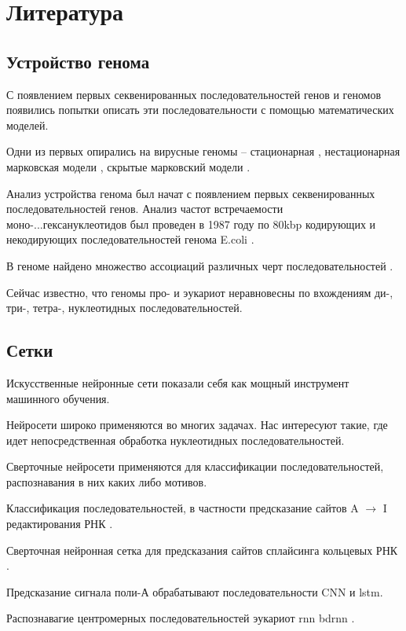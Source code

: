 \section{Литература}
\subsection{Устройство генома}
С появлением первых секвенированных последовательностей генов и геномов появились попытки описать эти последовательности с помощью математических моделей.

Одни из первых опирались на вирусные геномы -- стационарная \cite{garden_markov_1980}, нестационарная марковская модели \cite{tavare_codon_1989}, скрытые марковский модели \cite{churchill_stochastic_1989}. 

Анализ устройства генома был начат с появлением первых секвенированных последовательностей генов. Анализ частот встречаемости моно-...гексануклеотидов был проведен в 1987 году по 80kbp кодирующих и некодирующих последовательностей генома E.coli \cite{phillips_mono-_1987}. 

В геноме найдено множество ассоциаций различных черт последовательностей \cite{pevzner_nucleotide_1992}.

Сейчас известно, что геномы про- и эукариот неравновесны по вхождениям ди-, три-, тетра-, нуклеотидных последовательностей.




\subsection{Сетки}
Искусственные нейронные сети показали себя как мощный инструмент машинного обучения.


Нейросети широко применяются во многих задачах.
Нас интересуют такие, где идет непосредственная обработка нуклеотидных последовательностей.


Сверточные нейросети применяются для классификации последовательностей, распознавания в них каких либо мотивов.

Классификация последовательностей, в частности предсказание сайтов A $\rightarrow $ I редактирования РНК   \cite{budach_pysster:_2018}.

Сверточная нейронная сетка для предсказания сайтов сплайсинга кольцевых РНК \cite{wang_deep_2019}.

 Предсказание сигнала поли-А \cite{arefeen_deeppasta:_2019} обрабатывают последовательности CNN и lstm.

Распознавагие центромерных последовательностей эукариот \cite{li_identifying_2019} rnn bdrnn .
